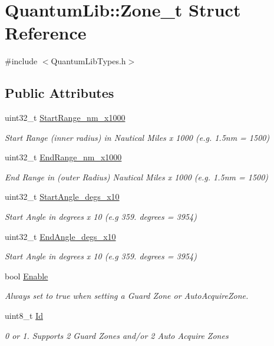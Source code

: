\hypertarget{struct_quantum_lib_1_1_zone__t}{}\section{Quantum\+Lib\+:\+:Zone\+\_\+t Struct Reference}
\label{struct_quantum_lib_1_1_zone__t}


{\ttfamily \#include $<$Quantum\+Lib\+Types.\+h$>$}

\subsection*{Public Attributes}
\begin{DoxyCompactItemize}
\item 
uint32\+\_\+t \mbox{\hyperlink{struct_quantum_lib_1_1_zone__t_abbb3333cca9fe0ba588ff587dd28a66a}{Start\+Range\+\_\+nm\+\_\+x1000}}
\begin{DoxyCompactList}\small\item\em Start Range (inner radius) in Nautical Miles x 1000 (e.\+g. 1.\+5nm = 1500) \end{DoxyCompactList}\item 
uint32\+\_\+t \mbox{\hyperlink{struct_quantum_lib_1_1_zone__t_a71ec031cf9d0cee829036d044b52d926}{End\+Range\+\_\+nm\+\_\+x1000}}
\begin{DoxyCompactList}\small\item\em End Range in (outer Radius) Nautical Miles x 1000 (e.\+g. 1.\+5nm = 1500) \end{DoxyCompactList}\item 
uint32\+\_\+t \mbox{\hyperlink{struct_quantum_lib_1_1_zone__t_aeee0428f3f061906525c2f694c2eff12}{Start\+Angle\+\_\+degs\+\_\+x10}}
\begin{DoxyCompactList}\small\item\em Start Angle in degrees x 10 (e.\+g 359. degrees = 3954) \end{DoxyCompactList}\item 
uint32\+\_\+t \mbox{\hyperlink{struct_quantum_lib_1_1_zone__t_ae00dbdd3360d76d3abe93a8fc8f3a4e0}{End\+Angle\+\_\+degs\+\_\+x10}}
\begin{DoxyCompactList}\small\item\em Start Angle in degrees x 10 (e.\+g 359. degrees = 3954) \end{DoxyCompactList}\item 
bool \mbox{\hyperlink{struct_quantum_lib_1_1_zone__t_a541618dd4336d68dc5ba58f04971e3e9}{Enable}}
\begin{DoxyCompactList}\small\item\em Always set to \textquotesingle{}true\textquotesingle{} when setting a Guard Zone or Auto\+Acquire\+Zone. \end{DoxyCompactList}\item 
uint8\+\_\+t \mbox{\hyperlink{struct_quantum_lib_1_1_zone__t_a65300b62b7f60ed8427ea34cb650b773}{Id}}
\begin{DoxyCompactList}\small\item\em 0 or 1. Supports 2 Guard Zones and/or 2 Auto Acquire Zones \end{DoxyCompactList}\end{DoxyCompactItemize}


